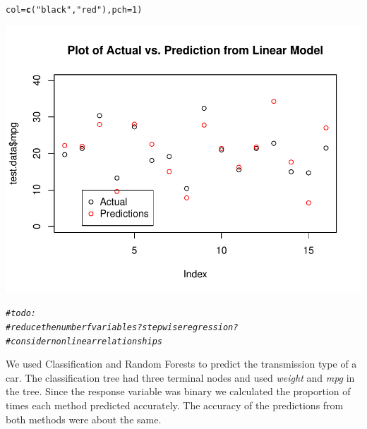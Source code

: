 \documentclass{article}\usepackage[]{graphicx}\usepackage[]{color}
\makeatletter
\def\maxwidth{ %
  \ifdim\Gin@nat@width>\linewidth
    \linewidth
  \else
    \Gin@nat@width
  \fi
}
\newcommand{\hlnum}[1]{\textcolor[rgb]{0.686,0.059,0.569}{#1}}%
\newcommand{\hlstr}[1]{\textcolor[rgb]{0.192,0.494,0.8}{#1}}%
\newcommand{\hlcom}[1]{\textcolor[rgb]{0.678,0.584,0.686}{\textit{#1}}}%
\newcommand{\hlstd}[1]{\textcolor[rgb]{0.345,0.345,0.345}{#1}}%
\newcommand{\hlkwc}[1]{\textcolor[rgb]{0.333,0.667,0.333}{#1}}%
\newcommand{\hlkwd}[1]{\textcolor[rgb]{0.737,0.353,0.396}{\textbf{#1}}}%
\newenvironment{kframe}{%
 \def\at@end@of@kframe{}%
 \ifinner\ifhmode%
  \def\at@end@of@kframe{\end{minipage}}%
  \begin{minipage}{\columnwidth}%
 \fi\fi%
 \def\FrameCommand##1{\hskip\@totalleftmargin \hskip-\fboxsep
 \colorbox{shadecolor}{##1}\hskip-\fboxsep
     \hskip-\linewidth \hskip-\@totalleftmargin \hskip\columnwidth}%
 \MakeFramed {\advance\hsize-\width
   \@totalleftmargin\z@ \linewidth\hsize
   \@setminipage}}%
 {\par\unskip\endMakeFramed%
 \at@end@of@kframe}
\newenvironment{knitrout}{}{} %
\makeatother
\begin{document}
\begin{knitrout}
\begin{kframe}
\begin{alltt}
       \hlkwc{col}\hlstd{=}\hlkwd{c}\hlstd{(}\hlstr{"black"}\hlstd{,} \hlstr{"red"}\hlstd{),}\hlkwc{pch} \hlstd{=} \hlnum{1}\hlstd{)}
\end{alltt}
\end{kframe}
\includegraphics[width=\maxwidth]{figure/unnamed-chunk-2-5} 
\begin{kframe}\begin{alltt}
\hlcom{# to do: }
\hlcom{# reduce the number f variables? stepwise regression?}
\hlcom{# consider nonlinear relationships }
\end{alltt}
\end{kframe}
\end{knitrout}


We used Classification and Random Forests to predict the transmission type of a car. The classification tree had three terminal nodes and used \textit{weight} and \textit{mpg} in the tree. Since the response variable was binary we calculated the proportion of times each method predicted  accurately. The accuracy of the predictions from both methods were about the same.  
\end{document}
